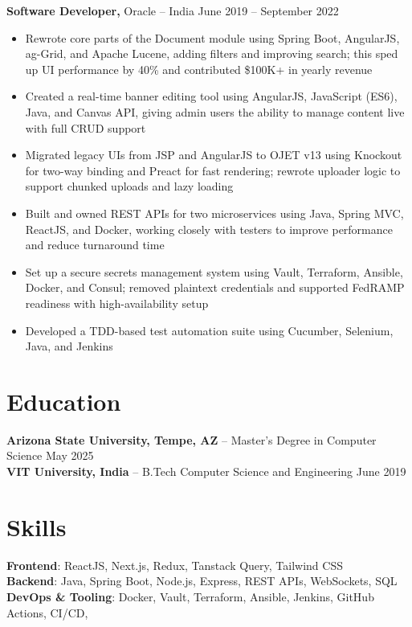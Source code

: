 \documentclass[11pt]{article}       %
\begin{document}
\textbf{Software Developer,} {Oracle} -- India \hfill June 2019 -- September 2022 \\
\vspace{-9pt}
\begin{itemize}

  \item Rewrote core parts of the Document module using Spring Boot, AngularJS, ag-Grid, and Apache Lucene, adding filters and improving search; this sped up UI performance by 40\% and contributed \$100K+ in yearly revenue
  \item Created a real-time banner editing tool using AngularJS, JavaScript (ES6), Java, and Canvas API, giving admin users the ability to manage content live with full CRUD support
  \item Migrated legacy UIs from JSP and AngularJS to OJET v13 using Knockout for two-way binding and Preact for fast rendering; rewrote uploader logic to support chunked uploads and lazy loading
  \item Built and owned REST APIs for two microservices using Java, Spring MVC, ReactJS, and Docker, working closely with testers to improve performance and reduce turnaround time
  \item Set up a secure secrets management system using Vault, Terraform, Ansible, Docker, and Consul; removed plaintext credentials and supported FedRAMP readiness with high-availability setup
  \item Developed a TDD-based test automation suite using Cucumber, Selenium, Java, and Jenkins
\end{itemize}
\vspace{-6.5pt}

\section*{Education}
\textbf{Arizona State University, Tempe, AZ} -- Master's Degree in Computer Science \hfill May 2025 \\
\textbf{VIT University, India} -- B.Tech Computer Science and Engineering \hfill June 2019 \\

\section*{Skills}
\textbf{Frontend}: ReactJS, Next.js, Redux, Tanstack Query, Tailwind CSS\\
\textbf{Backend}: Java, Spring Boot, Node.js, Express, REST APIs, WebSockets, SQL \\ 
\textbf{DevOps \& Tooling}: Docker, Vault, Terraform, Ansible, Jenkins, GitHub Actions, CI/CD,
\vspace{-6.5pt}


\vspace{-18.5pt}
\end{document}
